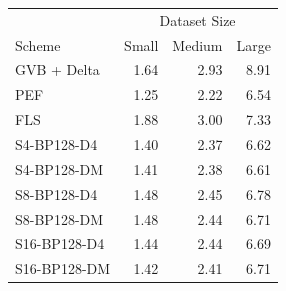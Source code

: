 \begin{tabular}{lrrr}
\toprule
 & \multicolumn{3}{c}{Dataset Size} \\
Scheme & Small & Medium & Large \\
\midrule
GVB + Delta & 1.64 & 2.93 & 8.91 \\
PEF & 1.25 & 2.22 & 6.54 \\
FLS & 1.88 & 3.00 & 7.33 \\
S4-BP128-D4 & 1.40 & 2.37 & 6.62 \\
S4-BP128-DM & 1.41 & 2.38 & 6.61 \\
S8-BP128-D4 & 1.48 & 2.45 & 6.78 \\
S8-BP128-DM & 1.48 & 2.44 & 6.71 \\
S16-BP128-D4 & 1.44 & 2.44 & 6.69 \\
S16-BP128-DM & 1.42 & 2.41 & 6.71 \\
\bottomrule
\end{tabular}
